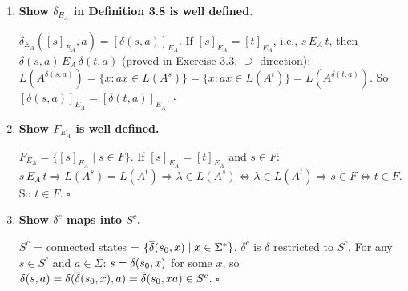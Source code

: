 \begin{enumerate}[{3.}1.]
($\supseteq$): $E_A\subseteq E_{iA}$ for all $i$ (by induction on $i$). $i=0$: $s\,E_A\,t\Rightarrow L(A^s)=L(A^t)\Rightarrow(\lambda\in L(A^s)\Leftrightarrow\lambda\in L(A^t))\Rightarrow(s\in F\Leftrightarrow t\in F)$. Step: if $E_A\subseteq E_{iA}$ and $s\,E_A\,t$, then $\delta(s,a)\,E_A\,\delta(t,a)$ (since $E_A$ is a right congruence on states -- actually prove this: $L(A^{\delta(s,a)})=\{x:ax\in L(A^s)\}=\{x:ax\in L(A^t)\}=L(A^{\delta(t,a)})$). So $\delta(s,a)\,E_A\,\delta(t,a)$, and by IH $\delta(s,a)\,E_{iA}\,\delta(t,a)$; also $s\,E_{iA}\,t$ by IH. Hence $s\,E_{i+1,A}\,t$. So $E_A\subseteq\bigcap_j E_{jA}$.

($\subseteq$): Show $\bigcap_j E_{jA}\subseteq E_A$. Suppose $s\,E_{jA}\,t$ for all $j$. By induction on $|x|$: $\DBAR(s,x)\,E_{0A}\,\DBAR(t,x)$ for all $x$, which means $\DBAR(s,x)\in F\Leftrightarrow\DBAR(t,x)\in F$, i.e., $x\in L(A^s)\Leftrightarrow x\in L(A^t)$. Proof: $|x|=0$: $s\,E_{0A}\,t$ (given). $|x|=n+1$, $x=ay$: $\DBAR(s,ay)=\DBAR(\delta(s,a),y)$. Since $s\,E_{jA}\,t$ for all $j$ (given), in particular $s\,E_{n+1,A}\,t$, so $\delta(s,a)\,E_{nA}\,\delta(t,a)$ and $\delta(s,a)\,E_{jA}\,\delta(t,a)$ for all $j\geq 1$. By IH: $\DBAR(\delta(s,a),y)\,E_{0A}\,\DBAR(\delta(t,a),y)$. So $L(A^s)=L(A^t)$, i.e., $s\,E_A\,t$. $\square$

\item \textbf{Show $\delta_{E_A}$ in Definition 3.8 is well defined.}

$\delta_{E_A}([s]_{E_A},a)=[\delta(s,a)]_{E_A}$. If $[s]_{E_A}=[t]_{E_A}$, i.e., $s\,E_A\,t$, then $\delta(s,a)\,E_A\,\delta(t,a)$ (proved in Exercise 3.3, $\supseteq$ direction): $L(A^{\delta(s,a)})=\{x:ax\in L(A^s)\}=\{x:ax\in L(A^t)\}=L(A^{\delta(t,a)})$. So $[\delta(s,a)]_{E_A}=[\delta(t,a)]_{E_A}$. $\square$

\item \textbf{Show $F_{E_A}$ is well defined.}

$F_{E_A}=\{[s]_{E_A}\mid s\in F\}$. If $[s]_{E_A}=[t]_{E_A}$ and $s\in F$: $s\,E_A\,t\Rightarrow L(A^s)=L(A^t)\Rightarrow\lambda\in L(A^s)\Leftrightarrow\lambda\in L(A^t)\Rightarrow s\in F\Leftrightarrow t\in F$. So $t\in F$. $\square$

\item \textbf{Show $\delta^c$ maps into $S^c$.}

$S^c$ = connected states = $\{\overline{\delta}(s_0,x)\mid x\in\Sigma^*\}$. $\delta^c$ is $\delta$ restricted to $S^c$. For any $s\in S^c$ and $a\in\Sigma$: $s=\overline{\delta}(s_0,x)$ for some $x$, so $\delta(s,a)=\delta(\overline{\delta}(s_0,x),a)=\overline{\delta}(s_0,xa)\in S^c$. $\square$


\end{enumerate}
